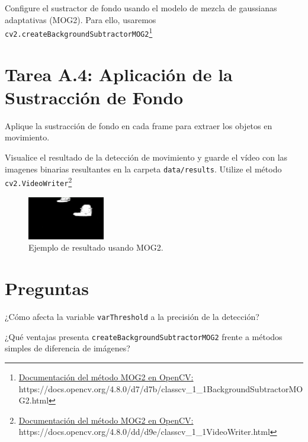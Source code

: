 Configure el sustractor de fondo usando el modelo de mezcla de gaussianas adaptativas (MOG2). Para ello, usaremos \texttt{cv2.createBackgroundSubtractorMOG2}\footnote{ \href{https://docs.opencv.org/4.8.0/d7/d7b/classcv_1_1BackgroundSubtractorMOG2.html}{Documentación del método MOG2 en OpenCV:} \\{https://docs.opencv.org/4.8.0/d7/d7b/classcv\_1\_1BackgroundSubtractorMOG2.html}}

\section*{Tarea A.4: Aplicación de la Sustracción de Fondo}
{}
Aplique la sustracción de fondo en cada frame para extraer los objetos en movimiento.


Visualice el resultado de la detección de movimiento y guarde el vídeo con las imagenes binarias resultantes en la carpeta \texttt{data/results}. Utilize el método \texttt{cv2.VideoWriter}\footnote{ \href{https://docs.opencv.org/4.8.0/dd/d9e/classcv_1_1VideoWriter.html}{Documentación del método MOG2 en OpenCV:} \\{https://docs.opencv.org/4.8.0/dd/d9e/classcv\_1\_1VideoWriter.html}}

\begin{figure}[H]
    \centering
    \includegraphics[width=0.3\textwidth]{Lab_4/template/figures/MOG2.png}
    \caption{Ejemplo de resultado usando MOG2.}
    \label{fig:ejemplo_mog2}
\end{figure}

\section*{Preguntas}

\vspace{5mm}
\begin{tcolorbox}[colback=gray!10, colframe=gray!30, coltitle=black, title=Pregunta A.1, halign=left]
¿Cómo afecta la variable \texttt{varThreshold} a la precisión de la detección?
\end{tcolorbox}

\vspace{5mm}
\begin{tcolorbox}[colback=gray!10, colframe=gray!30, coltitle=black, title=Pregunta A.2, halign=left]
¿Qué ventajas presenta \texttt{createBackgroundSubtractorMOG2} frente a métodos simples de diferencia de imágenes?
\end{tcolorbox}